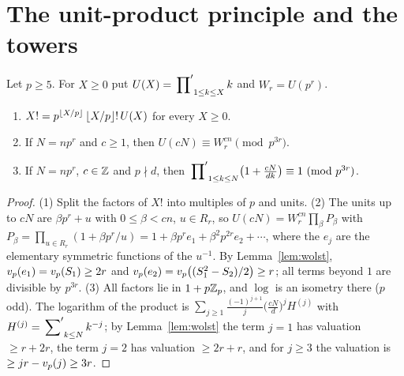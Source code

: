 \documentclass[11pt]{amsart}
\begin{document}
\section{The unit-product principle and the towers}\label{sec:unitprod}

Let $p\ge5$. For $X\ge0$ put $U(X)=\sideset{}{'}\prod_{1\le k\le X}k$ and $W_r=U(p^r)$.
\begin{lemma}\label{lem:units}
\begin{enumerate}
\item $X!=p^{\left\lfloor X/p\right\rfloor}\left\lfloor X/p\right\rfloor!\,U(X)$ for every $X\ge0$.
\item If $N=np^r$ and $c\ge1$, then $U(cN)\equiv W_r^{cn}\pmod{p^{3r}}$.
\item If $N=np^r$, $c\in\mathbb{Z}$ and $p\nmid d$, then $\sideset{}{'}\prod_{1\le k\le N}\bigl(1+\frac{cN}{dk}\bigr)\equiv1\ (\mathrm{mod}\ p^{3r})$.
\end{enumerate}
\end{lemma}
\begin{proof}
(1) Split the factors of $X!$ into multiples of $p$ and units. (2) The units up to $cN$ are $\beta p^r+u$ with $0\le\beta<cn$, $u\in R_r$, so $U(cN)=W_r^{cn}\prod_\beta P_\beta$ with $P_\beta=\prod_{u\in R_r}(1+\beta p^r/u)=1+\beta p^re_1+\beta^2p^{2r}e_2+\cdots$, where the $e_j$ are the elementary symmetric functions of the $u^{-1}$. By Lemma~\ref{lem:wolst}, $v_p(e_1)=v_p(S_1)\ge2r$ and $v_p(e_2)=v_p\bigl((S_1^2-S_2)/2\bigr)\ge r$; all terms beyond $1$ are divisible by $p^{3r}$. (3) All factors lie in $1+p\mathbb{Z}_{p}$, and $\log$ is an isometry there ($p$ odd). The logarithm of the product is $\sum_{j\ge1}\frac{(-1)^{j+1}}j\bigl(\frac{cN}d\bigr)^jH^{(j)}$ with $H^{(j)}=\sideset{}{'}\sum_{k\le N}k^{-j}$; by Lemma~\ref{lem:wolst} the term $j=1$ has valuation $\ge r+2r$, the term $j=2$ has valuation $\ge2r+r$, and for $j\ge3$ the valuation is $\ge jr-v_p(j)\ge3r$.
\end{proof}
\end{document}

